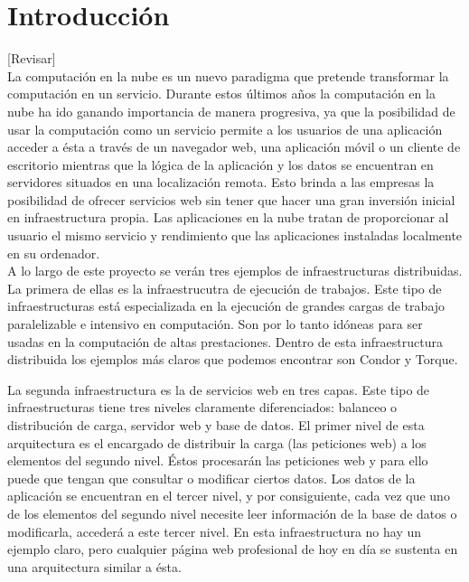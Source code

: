 \chapter{Introducción}
\label{cap:introduccion}

[Revisar]\\

La computación en la nube es un nuevo paradigma que pretende transformar la computación en un servicio. Durante estos últimos años la computación en la nube ha ido ganando importancia de manera progresiva, ya que la posibilidad de usar la computación como un servicio permite a los usuarios de una aplicación acceder a ésta a través de un navegador web, una aplicación móvil o un cliente de escritorio mientras que la lógica de la aplicación y los datos se encuentran en servidores situados en una localización remota. Esto brinda a las empresas la posibilidad de ofrecer servicios web sin tener que hacer una gran inversión inicial en infraestructura propia. Las aplicaciones en la nube tratan de proporcionar al usuario el mismo servicio y rendimiento que las aplicaciones instaladas localmente en su ordenador.\\

A lo largo de este proyecto se verán tres ejemplos de infraestructuras distribuidas. La primera de ellas es la infraestrucutra de ejecución de trabajos. Este tipo de infraestructuras está especializada en la ejecución de grandes cargas de trabajo paralelizable e intensivo en computación. Son por lo tanto idóneas para ser usadas en la computación de altas prestaciones. Dentro de esta infraestructura distribuida los ejemplos más claros que podemos encontrar son Condor y Torque.

La segunda infraestructura es la de servicios web en tres capas. Este tipo de infraestructuras tiene tres niveles claramente diferenciados: balanceo o distribución de carga, servidor web y base de datos. El primer nivel de esta arquitectura es el encargado de distribuir la carga (las peticiones web) a los elementos del segundo nivel. Éstos procesarán las peticiones web y para ello puede que tengan que consultar o modificar ciertos datos. Los datos de la aplicación se encuentran en el tercer nivel, y  por consiguiente, cada vez que uno de los elementos del segundo nivel necesite leer información de la base de datos o modificarla, accederá a este tercer nivel. En esta infraestructura no hay un ejemplo claro, pero cualquier página web profesional de hoy en día se sustenta en una arquitectura similar a ésta.

